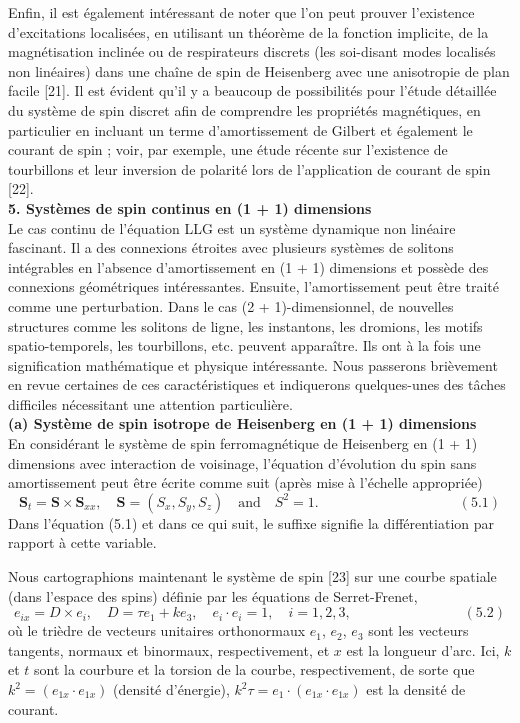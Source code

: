 \documentclass{article}
\begin{document}
   Enfin, il est également intéressant de noter que l'on peut prouver l'existence d'excitations localisées, en utilisant un théorème de la fonction implicite, de la magnétisation inclinée ou de respirateurs discrets (les soi-disant modes localisés non linéaires) dans une chaîne de spin de Heisenberg avec une anisotropie de plan facile [21]. Il est évident qu'il y a beaucoup de possibilités pour l'étude détaillée du système de spin discret afin de comprendre les propriétés magnétiques, en particulier en incluant un terme d'amortissement de Gilbert et également le courant de spin ; voir, par exemple, une étude récente sur l'existence de tourbillons et leur inversion de polarité lors de l'application de courant de spin [22].\\
   
   \textbf{5. Systèmes de spin continus en (1 + 1) dimensions}\\
   
   Le cas continu de l'équation LLG est un système dynamique non linéaire fascinant. Il a des connexions étroites avec plusieurs systèmes de solitons intégrables en l'absence d'amortissement en (1 + 1) dimensions et possède des connexions géométriques intéressantes. Ensuite, l'amortissement peut être traité comme une perturbation. Dans le cas (2 + 1)-dimensionnel, de nouvelles structures comme les solitons de ligne, les instantons, les dromions, les motifs spatio-temporels, les tourbillons, etc. peuvent apparaître. Ils ont à la fois une signification mathématique et physique intéressante. Nous passerons brièvement en revue certaines de ces caractéristiques et indiquerons quelques-unes des tâches difficiles nécessitant une attention particulière.\\
   
   \textbf{(a) Système de spin isotrope de Heisenberg en (1 + 1) dimensions} \\
   
   En considérant le système de spin ferromagnétique de Heisenberg en (1 + 1) dimensions avec interaction de voisinage, l'équation d'évolution du spin sans amortissement peut être écrite comme suit (après mise à l'échelle appropriée)
    \[
   \mathbf{S}_t = \mathbf{S} \times \mathbf{S}_{xx}, \quad \mathbf{S} = (S_x, S_y, S_z) \quad \text{and} \quad S^2 = 1. \qquad \qquad \qquad \qquad \qquad (5.1)
   \]
   Dans l'équation (5.1) et dans ce qui suit, le suffixe signifie la différentiation par rapport à cette variable.
   
   Nous cartographions maintenant le système de spin [23] sur une courbe spatiale (dans l'espace des spins) définie par les équations de Serret-Frenet,
    \[
   e_{ix}  = D \times e_i, \quad D = \tau e_1 + k e_3, \quad e_i \cdot e_i = 1, \quad i = 1, 2, 3, \qquad \qquad \qquad \qquad (5.2)
   \]
   où le trièdre de vecteurs unitaires orthonormaux \(e_1\), \(e_2\), \(e_3\) sont les vecteurs tangents, normaux et binormaux, respectivement, et \(x\) est la longueur d'arc. Ici, \(k\) et \(t\) sont la courbure et la torsion de la courbe, respectivement, de sorte que \(k^2 = (e_{1x} \cdot e_{1x})\) (densité d'énergie), \(k^2 \tau = e_1 \cdot (e_{1x} \cdot e_{1x})\) est la densité de courant.
   
\end{document}
